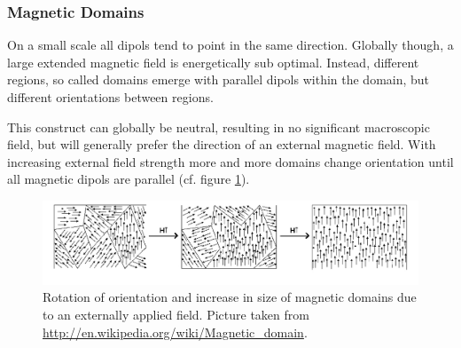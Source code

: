\documentclass[a4paper]{scrartcl}
\numberwithin{equation}{section}
\numberwithin{figure}{section}
\numberwithin{table}{section}
\begin{document}
\subsubsection*{Magnetic Domains}
On a small scale all dipols tend to point in the same direction. Globally though, a large extended magnetic field is energetically sub optimal. Instead, different regions, so called domains emerge with parallel dipols within the domain, but different orientations between regions.

This construct can globally be neutral, resulting in no significant macroscopic field, but will generally prefer the direction of an external magnetic field. With increasing external field strength more and more domains change orientation until all magnetic dipols are parallel (cf. figure \ref{fig:doms}).
\begin{figure}
        \begin{center}
         \includegraphics[width=0.9\linewidth]{img/Dominios.pdf}
        \end{center}
        \caption{
\small Rotation of orientation and increase in size of magnetic domains due to an externally applied field. Picture taken from \url{http://en.wikipedia.org/wiki/Magnetic_domain}.
        }
        \label{fig:doms}
\end{figure}
\end{document}
